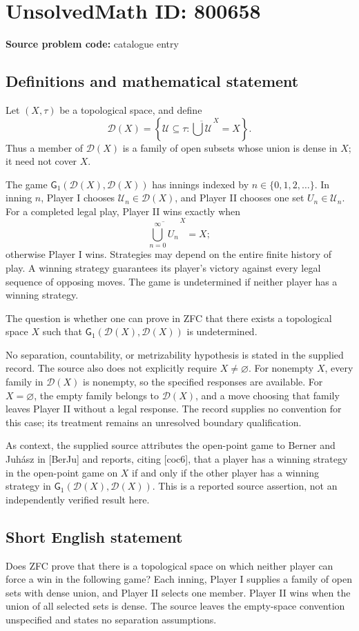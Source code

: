 \documentclass[11pt]{article}
\begin{document}
\section*{UnsolvedMath ID: 800658}
\textbf{Source problem code:} catalogue entry
\subsection{Definitions and mathematical statement}
Let \((X,\tau)\) be a topological space, and define
\[
\mathcal D(X)=\left\{\mathcal U\subseteq\tau:\overline{\bigcup\mathcal U}^{\,X}=X\right\}.
\]
Thus a member of \(\mathcal D(X)\) is a family of open subsets whose union is dense in \(X\); it need not cover \(X\).

The game \(\mathsf G_1(\mathcal D(X),\mathcal D(X))\) has innings indexed by \(n\in\{0,1,2,\ldots\}\). In inning \(n\), Player I chooses \(\mathcal U_n\in\mathcal D(X)\), and Player II chooses one set \(U_n\in\mathcal U_n\). For a completed legal play, Player II wins exactly when
\[
\overline{\bigcup_{n=0}^{\infty}U_n}^{\,X}=X;
\]
otherwise Player I wins. Strategies may depend on the entire finite history of play. A winning strategy guarantees its player's victory against every legal sequence of opposing moves. The game is undetermined if neither player has a winning strategy.

The question is whether one can prove in ZFC that there exists a topological space \(X\) such that \(\mathsf G_1(\mathcal D(X),\mathcal D(X))\) is undetermined.

No separation, countability, or metrizability hypothesis is stated in the supplied record. The source also does not explicitly require \(X\ne\varnothing\). For nonempty \(X\), every family in \(\mathcal D(X)\) is nonempty, so the specified responses are available. For \(X=\varnothing\), the empty family belongs to \(\mathcal D(X)\), and a move choosing that family leaves Player II without a legal response. The record supplies no convention for this case; its treatment remains an unresolved boundary qualification.

As context, the supplied source attributes the open-point game to Berner and Juh\'asz in [BerJu] and reports, citing [coc6], that a player has a winning strategy in the open-point game on \(X\) if and only if the other player has a winning strategy in \(\mathsf G_1(\mathcal D(X),\mathcal D(X))\). This is a reported source assertion, not an independently verified result here.
\subsection{Short English statement}
Does ZFC prove that there is a topological space on which neither player can force a win in the following game? Each inning, Player I supplies a family of open sets with dense union, and Player II selects one member. Player II wins when the union of all selected sets is dense. The source leaves the empty-space convention unspecified and states no separation assumptions.
\end{document}
